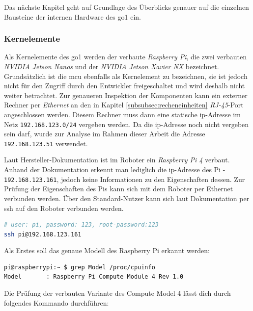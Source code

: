 Das nächste Kapitel geht auf Grundlage des Überblicks genauer auf die einzelnen Bausteine der internen Hardware des \gls{go1}
ein.

\subsubsection{Kernelemente}

Als Kernelemente des \gls{go1} werden der verbaute \emph{Raspberry Pi}, die zwei verbauten \emph{NVIDIA Jetson Nanos} und
der \emph{NVIDIA Jetson Xavier NX} bezeichnet.
Grundsätzlich ist die \gls{mcu} ebenfalls als Kernelement zu bezeichnen, sie ist jedoch nicht für den Zugriff durch den
Entwickler freigeschaltet und wird deshalb nicht weiter betrachtet.
Zur genaueren Inspektion der Komponenten kann ein externer Rechner per \emph{Ethernet} an den in Kapitel \ref{subsubsec:recheneinheiten}
\emph{RJ-45}-Port angeschlossen werden.
Diesem Rechner muss dann eine statische \gls{ip}-Adresse im Netz \texttt{192.168.123.0/24} vergeben werden.
Da die \gls{ip}-Adresse noch nicht vergeben sein darf, wurde zur Analyse im Rahmen dieser Arbeit die Adresse \texttt{192.168.123.51}
verwendet.

\label{par:raspi}

Laut Hersteller-Dokumentation ist im Roboter ein \emph{Raspberry Pi \num{4}} verbaut.
Anhand der Dokumentation erkennt man lediglich die \gls{ip}-Adresse des Pi - \texttt{192.168.123.161}, jedoch keine Informationen
zu den Eigenschaften dessen.
Zur Prüfung der Eigenschaften des Pis kann sich mit dem Roboter per Ethernet verbunden werden.
Über den Standard-Nutzer kann sich laut Dokumentation per \gls{ssh} auf den Roboter verbunden werden.

\begin{lstlisting}[language=sh,label=lst:pi-ssh]
# user: pi, password: 123, root-password:123
ssh pi@192.168.123.161
\end{lstlisting}

\noindent Als Erstes soll das genaue Modell des Raspberry Pi erkannt werden:

\begin{lstlisting}[language=sh, label=lst:pi-model]
pi@raspberrypi:~ $ grep Model /proc/cpuinfo
Model		: Raspberry Pi Compute Module 4 Rev 1.0
\end{lstlisting}

\noindent Die Prüfung der verbauten Variante des Compute Model 4 lässt dich durch folgendes Kommando durchführen:

